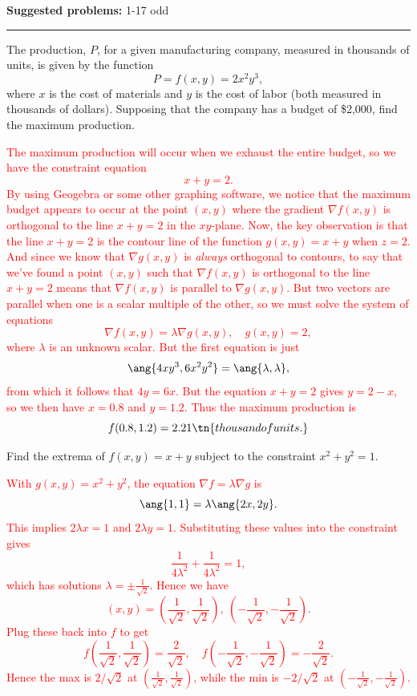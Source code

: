 \documentclass[12pt,reqno]{amsart}
\begin{document}
\textbf{Suggested problems:} 1-17 odd

\bigskip
\hrule

\bigskip

\prob The production, $P$, for a given manufacturing company, measured in thousands of units, is given by the function
	\[P = f(x,y) = 2x^2y^3,
	\]
where $x$ is the cost of materials and $y$ is the cost of labor (both measured in thousands of dollars). Supposing that the company has a budget of \$2,000, find the maximum production.

\bigskip
\textcolor{red}{The maximum production will occur when we exhaust the entire budget, so we have the constraint equation
	\[x+y=2.
	\]
By using Geogebra or some other graphing software, we notice that the maximum budget appears to occur at the point $(x,y)$ where the gradient $\nabla f(x,y)$ is orthogonal to the line $x+y=2$ in the $xy$-plane. Now, the key observation is that the line $x+y=2$ is the contour line of the function $g(x,y)=x+y$ when $z=2$. And since we know that $\nabla g(x,y)$ is \textit{always} orthogonal to contours, to say that we've found a point $(x,y)$ such that $\nabla f(x,y)$ is orthogonal to the line $x+y=2$ means that $\nabla f(x,y)$ is parallel to $\nabla g(x,y)$. But two vectors are parallel when one is a scalar multiple of the other, so we must solve the system of equations
	\[\nabla f(x,y) = \lambda \nabla g(x,y), \quad g(x,y) = 2,
	\] 
where $\lambda$ is an unknown scalar. But the first equation is just
	\[\ang{4xy^3,6x^2y^2} = \ang{ \lambda, \lambda},
	\]
from which it follows that $4y = 6x$. But the equation $x+y=2$ gives $y=2-x$, so we then have $x=0.8$ and $y=1.2$. Thus the maximum production is
	\[f(0.8,1.2) = 2.21  \tn{ thousand of units.}
	\]}
\bigskip

\vfill
\prob Find the extrema of $f(x,y) = x+y$ subject to the constraint $x^2+y^2=1$.

\bigskip
\textcolor{red}{With $g(x,y) = x^2+y^2$, the equation $\nabla f = \lambda \nabla g$ is
	\[\ang{1,1} = \lambda \ang{2x,2y}.
	\]
This implies $2\lambda x = 1$ and $2\lambda y =1$. Substituting these values into the constraint gives
	\[\frac{1}{4\lambda^2} + \frac{1}{4\lambda^2} =1,
	\]
which has solutions $\lambda = \pm \frac{1}{\sqrt{2}}$. Hence we have
	\[(x,y) = \left( \frac{1}{\sqrt{2}}, \frac{1}{\sqrt{2}} \right), \ \left(- \frac{1}{\sqrt{2}},- \frac{1}{\sqrt{2}} \right).
	\]
Plug these back into $f$ to get
	\[f \left( \frac{1}{\sqrt{2}}, \frac{1}{\sqrt{2}} \right) = \frac{2}{\sqrt{2}}, \quad f\left(- \frac{1}{\sqrt{2}},- \frac{1}{\sqrt{2}} \right) = -\frac{2}{\sqrt{2}}.
	\]
Hence the max is $2/\sqrt{2}$ at $\left( \frac{1}{\sqrt{2}}, \frac{1}{\sqrt{2}} \right)$, while the min is $-2/\sqrt{2}$ at $\left(- \frac{1}{\sqrt{2}},- \frac{1}{\sqrt{2}} \right)$.}
\bigskip
\end{document}
